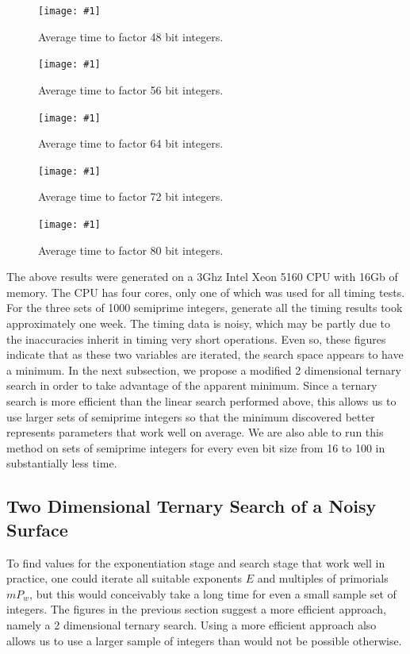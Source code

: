 \documentclass{ucalgthes1}
\theoremstyle{definition}
\newcommand{\mygraphXPNG}[4]{
	\begin{figure}[htb]
	\centering
	\texttt{[image: \#1]}
	\caption[#4]{#3}
	\label{#2}
	\end{figure}
}
\begin{document}
\mygraphXPNG{bits-48-3d.png}{fig:search48td}{Average time to factor 48 bit integers.}{48 bit Factoring Search Space.}
\mygraphXPNG{bits-56-3d.png}{fig:search56td}{Average time to factor 56 bit integers.}{56 bit Factoring Search Space.}
\mygraphXPNG{bits-64-3d.png}{fig:search64td}{Average time to factor 64 bit integers.}{64 bit Factoring Search Space.}
\mygraphXPNG{bits-72-3d.png}{fig:search72td}{Average time to factor 72 bit integers.}{72 bit Factoring Search Space.}
\mygraphXPNG{bits-80-3d.png}{fig:search80td}{Average time to factor 80 bit integers.}{80 bit Factoring Search Space.}

\clearpage

The above results were generated on a 3Ghz Intel Xeon 5160 CPU with 16Gb of memory.  The CPU has four cores, only one of which was used for all timing tests.  For the three sets of 1000 semiprime integers, generate all the timing results took approximately one week.  The timing data is noisy, which may be partly due to the inaccuracies inherit in timing very short operations.  Even so, these figures indicate that as these two variables are iterated, the search space appears to have a minimum.  In the next subsection, we propose a modified 2 dimensional ternary search in order to take advantage of the apparent minimum.  Since a ternary search is more efficient than the linear search performed above, this allows us to use larger sets of semiprime integers so that the minimum discovered better represents parameters that work well on average.  We are also able to run this method on sets of semiprime integers for every even bit size from 16 to 100 in substantially less time.



\subsection{Two Dimensional Ternary Search of a Noisy Surface}
\label{subsec:ssparNoisyCurve}

\newcommand{\xmin}{x_{\textrm{min}}}
\newcommand{\xmax}{x_{\textrm{max}}}
\newcommand{\xlo}{x_{\textrm{lo}}}
\newcommand{\xhi}{x_{\textrm{hi}}}
\newcommand{\xonethird}{x_\ell}
\newcommand{\xtwothird}{x_h}
\newcommand{\ymin}{y_{\textrm{min}}}
\newcommand{\ymax}{y_{\textrm{max}}}
\newcommand{\ylo}{y_{\textrm{lo}}}
\newcommand{\yhi}{y_{\textrm{hi}}}
\newcommand{\yonethird}{y_\ell}
\newcommand{\ytwothird}{y_h}
\newcommand{\tonethird}{t_\ell}
\newcommand{\ttwothird}{t_h}
\newcommand{\timefnc}{\mathcal T}

To find values for the exponentiation stage and search stage that work well in practice, one could iterate all suitable exponents $E$ and multiples of primorials $mP_w$, but this would conceivably take a long time for even a small sample set of integers.  The figures in the previous section suggest a more efficient approach, namely a 2 dimensional ternary search.  Using a more efficient approach also allows us to use a larger sample of integers than would not be possible otherwise.
\end{document}
